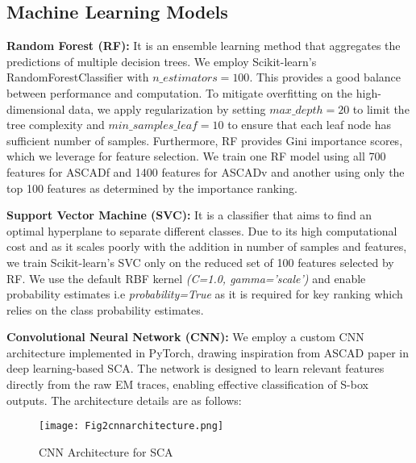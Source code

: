 \documentclass[runningheads]{llncs}
\begin{document}
\subsection{Machine Learning Models}

\textbf{Random Forest (RF):} It is an ensemble learning method that aggregates the predictions of multiple decision trees. We employ Scikit-learn's RandomForestClassifier with $n\_estimators=100$. This provides a good balance between performance and computation. To mitigate overfitting on the high-dimensional data, we apply regularization by setting $max\_depth=20$ to limit the tree complexity and $min\_samples\_leaf=10$ to ensure that each leaf node has sufficient number of samples. Furthermore, RF provides Gini importance scores, which we leverage for feature selection. We train one RF model using all 700 features for ASCADf and 1400 features for ASCADv and another using only the top 100 features as determined by the importance ranking.

\textbf{Support Vector Machine (SVC):} It is a classifier that aims to find an optimal hyperplane to separate different classes. Due to its high computational cost and as it scales poorly with the addition in number of samples and features, we train Scikit-learn's SVC only on the reduced set of 100 features selected by RF. We use the default RBF kernel \textit{(C=1.0, gamma='scale')} and enable probability estimates i.e \textit{probability=True} as it is required for key ranking which relies on the class probability estimates.

\textbf{Convolutional Neural Network (CNN):} We employ a custom CNN architecture implemented in PyTorch, drawing inspiration from ASCAD paper in deep learning-based SCA. The network is designed to learn relevant features directly from the raw EM traces, enabling effective classification of S-box outputs. The architecture details are as follows:
\begin{figure}[hbtp]
    \centering
    \texttt{[image: Fig2cnnarchitecture.png]}
    \caption{CNN Architecture for SCA}
    \label{fig:cnn_architecture}
\end{figure}
\end{document}
